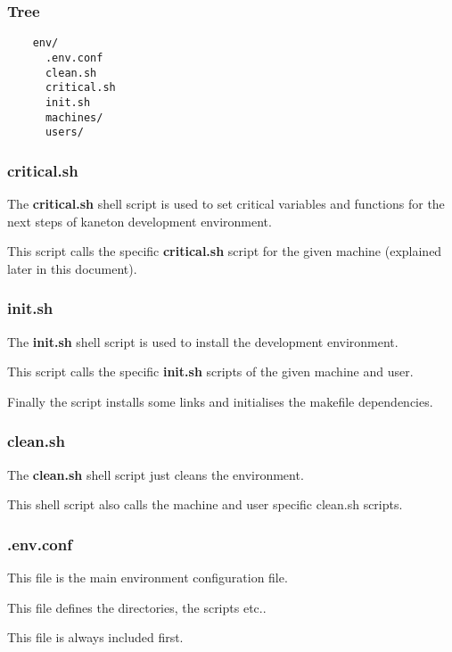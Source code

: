 
\begin{frame}[containsverbatim]
  \frametitle{Tree}

  \begin{verbatim}
    env/
      .env.conf
      clean.sh
      critical.sh
      init.sh
      machines/
      users/
  \end{verbatim}
\end{frame}


\begin{frame}
  \frametitle{critical.sh}

  The \textbf{critical.sh} shell script is used to set critical variables and
  functions for the next steps of kaneton development environment.

  \nl

  This script calls the specific \textbf{critical.sh} script for the given
  machine (explained later in this document).

\end{frame}


\begin{frame}
  \frametitle{init.sh}

  The \textbf{init.sh} shell script is used to install the development
  environment.

  \nl

  This script calls the specific \textbf{init.sh} scripts of the given
  machine and user.

  \nl

  Finally the script installs some links and initialises the makefile
  dependencies.
\end{frame}


\begin{frame}
  \frametitle{clean.sh}

  The \textbf{clean.sh} shell script just cleans the environment.

  \nl

  This shell script also calls the machine and user specific clean.sh scripts.
\end{frame}


\begin{frame}
  \frametitle{.env.conf}

  This file is the main environment configuration file.

  \nl

  This file defines the directories, the scripts etc..

  \nl

  This file is always included first.
\end{frame}

